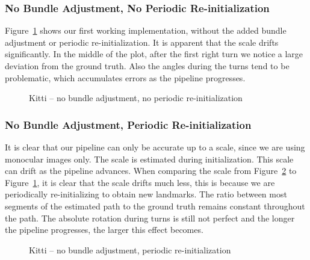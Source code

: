 \documentclass[11pt]{article}
\newlength\figureheight
\newlength\figurewidth
\begin{document}
\subsubsection{No Bundle Adjustment, No Periodic Re-initialization}
Figure~\ref{fig:Kitti_entire_no_BA_no_reinit_thin} shows our first working implementation, without the added bundle adjustment or periodic re-initialization. It is apparent that the scale drifts significantly. In the middle of the plot, after the first right turn we notice a large deviation from the ground truth. Also the angles during the turns tend to be problematic, which accumulates errors as the pipeline progresses.

\begin{figure}[h]
	\centering
	\setlength\figureheight{8cm} 
	\setlength\figurewidth{11cm}
	
	\caption{Kitti -- no bundle adjustment, no periodic re-initialization}
	\label{fig:Kitti_entire_no_BA_no_reinit_thin}
\end{figure}

\subsubsection{No Bundle Adjustment, Periodic Re-initialization}
It is clear that our pipeline can only be accurate up to a scale, since we are using monocular images only. The scale is estimated during initialization. This scale can drift as the pipeline advances. When comparing the scale from Figure~\ref{fig:Kitti_entire_no_BA_reinit_thin} to Figure~\ref{fig:Kitti_entire_no_BA_no_reinit_thin}, it is clear that the scale drifts much less, this is because we are periodically re-initializing to obtain new landmarks. The ratio between most segments of the estimated path to the ground truth remains constant throughout the path. The absolute rotation during turns is still not perfect and the longer the pipeline progresses, the larger this effect becomes.

\begin{figure}[h]
	\centering
	\setlength\figureheight{8cm} 
	\setlength\figurewidth{11cm}
	
	\caption{Kitti -- no bundle adjustment, periodic re-initialization}
	\label{fig:Kitti_entire_no_BA_reinit_thin}
\end{figure}
\end{document}
